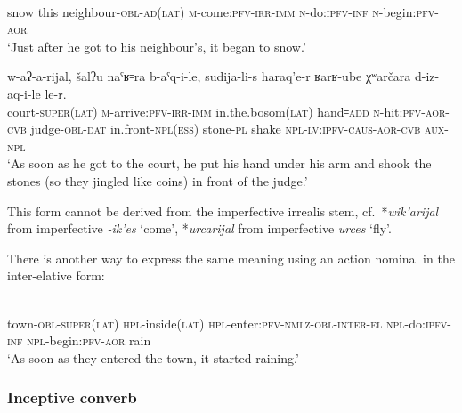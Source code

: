 ﻿\documentclass[output=paper]{langsci/langscibook}
\begin{document}
\ea \label{ex:8:9} %
\\
snow this neighbour-\textsc{obl}-\textsc{ad}(\textsc{lat}) \textsc{m}-come:\textsc{pfv}-\textsc{irr}-\textsc{imm} \textsc{n}-do:\textsc{ipfv}-\textsc{inf} \textsc{n}-begin:\textsc{pfv}-\textsc{aor}\\
\glt `Just after he got to his neighbour's, it began to snow.'

\pagebreak


\ex \label{ex:8:10} %
 {w-aʔ-a-rijal,} {šalʔu} {naˤʁ꞊ra} {b-aˤq-i-le,} {sudija-li-s} {haraq'e-r} {ʁarʁ-ube} {χʷarčara} {d-iz-aq-i-le} {le-r.}\\
court-\textsc{super}(\textsc{lat}) \textsc{m}-arrive:\textsc{pfv}-\textsc{irr}-\textsc{imm} in.the.bosom(\textsc{lat}) hand꞊\textsc{add} \textsc{n}-hit:\textsc{pfv}-\textsc{aor}-\textsc{cvb} judge-\textsc{obl}-\textsc{dat} in.front-\textsc{npl}(\textsc{ess}) stone-\textsc{pl} shake \textsc{npl}-\textsc{lv}:\textsc{ipfv}-\textsc{caus}-\textsc{aor}-\textsc{cvb} \textsc{aux}-\textsc{npl}\\
\glt `As soon as he got to the court, he put his hand under his arm and shook
the stones (so they jingled like coins) in front of the judge.' \citep[p.~147, sentence 27]{magometov1982}
\z


This form cannot be derived from the imperfective irrealis stem, cf.\
*\emph{wik'arijal} from imperfective \emph{-ik'es} `come', *\emph{urcarijal} from imperfective \emph{urces} `fly'.

There is another way to express the same meaning using an action
nominal in the inter-elative form:

\ea \label{ex:8:11} %
\\
town-\textsc{obl}-\textsc{super(lat)} \textsc{hpl}-inside(\textsc{lat}) \textsc{hpl}-enter:\textsc{pfv}-\textsc{nmlz}-\textsc{obl}-\textsc{inter}-\textsc{el} \textsc{npl}-do:\textsc{ipfv}-\textsc{inf} \textsc{npl}-begin:\textsc{pfv}-\textsc{aor} rain\\
\glt `As soon as they entered the town, it started raining.'
\z

\removelastskip


\subsubsection{Inceptive converb}
\end{document}
